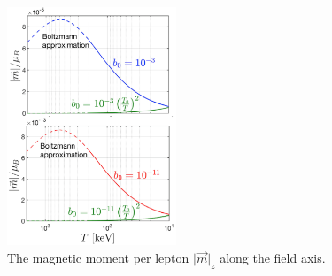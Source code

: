 \documentclass[reprint]{revtex4-2}
\begin{document}
\begin{figure}[ht]
    \centering
    \includegraphics[width=0.45\textwidth]{plots/NewMagnetizationDensity004_Boltz.png}
    \caption{The magnetic moment per lepton $\vert\vec{m}\vert_{z}$ along the field axis.}
    \label{fig:momentperlepton}
\end{figure}

\end{document}

